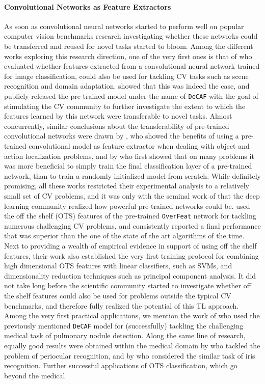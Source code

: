 \paragraph{Convolutional Networks as Feature Extractors}
As soon as convolutional neural networks started to perform well on popular computer vision benchmarks research investigating whether these networks could be transferred and reused for novel tasks started to bloom. Among the different works exploring this research direction, one of the very first ones is that of \citet{donahue2014decaf} who evaluated whether features extracted from a convolutional neural network trained for image classification, could also be used for tackling CV tasks such as scene recognition and domain adaptation. \citet{donahue2014decaf} showed that this was indeed the case, and publicly released the pre-trained model under the name of \texttt{DeCAF} with the goal of stimulating the CV community to further investigate the extent to which the features learned by this network were transferable to novel tasks. Almost concurrently, similar conclusions about the transferability of pre-trained convolutional networks were drawn by \citet{oquab2014learning}, who showed the benefits of using a pre-trained convolutional model as feature extractor when dealing with object and action localization problems, and by \citet{zeiler2014visualizing} who first showed that on many problems it was more beneficial to simply train the final classification layer of a pre-trained network, than to train a randomly initialized model from scratch. While definitely promising, all these works restricted their experimental analysis to a relatively small set of CV problems, and it was only with the seminal work of \citet{sharif2014cnn} that the deep learning community realized how powerful pre-trained networks could be. \citet{sharif2014cnn} used the off the shelf (OTS) features of the pre-trained \texttt{OverFeat} network \cite{sermanet2013overfeat} for tackling numerous challenging CV problems, and consistently reported a final performance that was superior than the one of the state of the art algorithms of the time. Next to providing a wealth of empirical evidence in support of using off the shelf features, their work also established the very first training protocol for combining high dimensional OTS features with linear classifiers, such as SVMs, and dimensionality reduction techniques such as principal component analysis. It did not take long before the scientific community started to investigate whether off the shelf features could also be used for problems outside the typical CV benchmarks, and therefore fully realized the potential of this TL approach. Among the very first practical applications, we mention the work of \citet{van2015off} who used the previously mentioned \texttt{DeCAF} model for (successfully) tackling the challenging medical task of pulmonary nodule detection. Along the same line of research, equally good results were obtained within the medical domain by \citet{hernandez2018periocular} who tackled the problem of periocular recognition, and by \citet{nguyen2017iris} who considered the similar task of iris recognition. Further successful applications of OTS classification, which go beyond the medical 